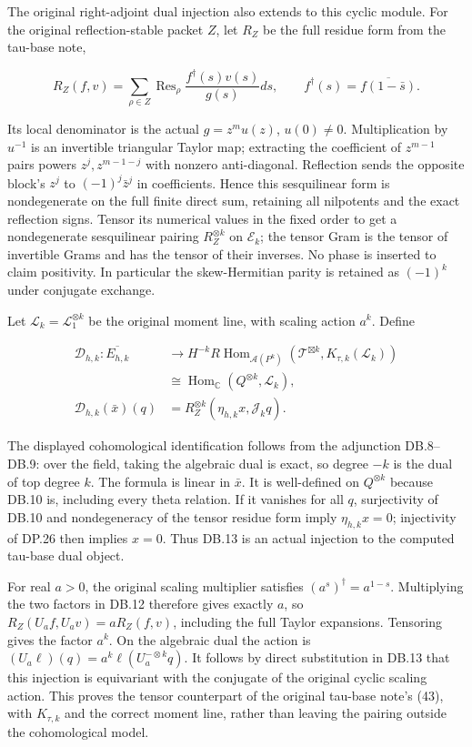 \documentclass{article}
\begin{document}
The original right-adjoint dual injection also extends to this cyclic module. For the original reflection-stable packet \(Z\), let \(R_Z\) be the full residue form from the tau-base note,

\[
R_Z(f,v)=\sum_{\rho\in Z}\operatorname{Res}_{\rho}
 \frac{f^\dagger(s)v(s)}{g(s)}ds,
\qquad f^\dagger(s)=\overline{f(1-\bar s)}.
\tag{DB.12}
\]

Its local denominator is the actual \(g=z^m u(z)\), \(u(0)\ne0\). Multiplication by \(u^{-1}\) is an invertible triangular Taylor map; extracting the coefficient of \(z^{m-1}\) pairs powers \(z^j,z^{m-1-j}\) with nonzero anti-diagonal. Reflection sends the opposite block's \(z^j\) to \((-1)^j\bar z^j\) in coefficients. Hence this sesquilinear form is nondegenerate on the full finite direct sum, retaining all nilpotents and the exact reflection signs. Tensor its numerical values in the fixed order to get a nondegenerate sesquilinear pairing \(R_Z^{\otimes k}\) on \(\mathcal E_k\); the tensor Gram is the tensor of invertible Grams and has the tensor of their inverses. No phase is inserted to claim positivity. In particular the skew-Hermitian parity is retained as \((-1)^k\) under conjugate exchange.

Let \(\mathcal L_k=\mathcal L_1^{\otimes k}\) be the original moment line, with scaling action \(a^k\). Define

\[
\begin{aligned}
\mathcal D_{h,k}:\overline{E_{h,k}}&\longrightarrow
H^{-k}R\operatorname{Hom}_{\mathcal A(P^k)}
 (\mathcal T^{\boxtimes k},K_{\tau,k}(\mathcal L_k))\\
&\cong\operatorname{Hom}_{\mathbb C}(Q^{\otimes k},\mathcal L_k),\\
\mathcal D_{h,k}(\bar x)(q)&=
R_Z^{\otimes k}(\eta_{h,k}x,\mathcal J_k q).
\end{aligned}
\tag{DB.13}
\]

The displayed cohomological identification follows from the adjunction DB.8--DB.9: over the field, taking the algebraic dual is exact, so degree \(-k\) is the dual of top degree \(k\). The formula is linear in \(\bar x\). It is well-defined on \(Q^{\otimes k}\) because DB.10 is, including every theta relation. If it vanishes for all \(q\), surjectivity of DB.10 and nondegeneracy of the tensor residue form imply \(\eta_{h,k}x=0\); injectivity of DP.26 then implies \(x=0\). Thus DB.13 is an actual injection to the computed tau-base dual object.

For real \(a>0\), the original scaling multiplier satisfies \((a^s)^\dagger=a^{1-s}\). Multiplying the two factors in DB.12 therefore gives exactly \(a\), so \(R_Z(U_af,U_av)=aR_Z(f,v)\), including the full Taylor expansions. Tensoring gives the factor \(a^k\). On the algebraic dual the action is \((U_a\ell)(q)=a^k\ell(U_a^{-\otimes k}q)\). It follows by direct substitution in DB.13 that this injection is equivariant with the conjugate of the original cyclic scaling action. This proves the tensor counterpart of the original tau-base note's (43), with \(K_{\tau,k}\) and the correct moment line, rather than leaving the pairing outside the cohomological model.
\end{document}
